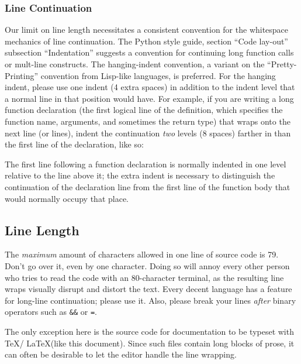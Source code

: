 \documentclass[12pt]{article}
\newcommand{\code}[1]{\texttt{#1}}
\begin{document}
\subsubsection{Line Continuation}
Our limit on line length necessitates a consistent convention for the whitespace mechanics of line continuation. The Python style guide, section ``Code lay-out'' subsection ``Indentation'' suggests a convention for continuing long function calls or mult-line constructs. The hanging-indent convention, a variant on the ``Pretty-Printing'' convention from Lisp-like languages, is preferred. For the hanging indent, please use one indent (4 extra spaces) in addition to the indent level that a normal line in that position would have. For example, if you are writing a long function declaration (the first logical line of the definition, which specifies the function name, arguments, and sometimes the return type) that wraps onto the next line (or lines), indent the continuation \emph{two} levels (8 spaces) farther in than the first line of the declaration, like so:
\begin{codeex}
// Function declaration
VisionInterface:: VisionInterface(
        Matx33f cameraMat, Mat distCoeffs, Matx33f perspTrans,
        std::string camAddress) :
        cameraMat(cameraMat), distCoeffs(distCoeffs), perspTrans(perspTrans) {
    // Start of function body
    if (!source.open(camAddress)) {
\end{codeex}
The first line following a function declaration is normally indented in one level relative to the line above it; the extra indent is necessary to distinguish the continuation of the declaration line from the first line of the function body that would normally occupy that place.

\subsection{Line Length} The \emph{maximum} amount of characters allowed in one line of source code is 79. Don't go over it, even by one character. Doing so will annoy every other person who tries to read the code with an 80-character terminal, as the resulting line wraps visually disrupt and distort the text. Every decent language has a feature for long-line continuation; please use it. Also, please break your lines \textit{after} binary operators such as \code{\&\&} or \code{=}.

The only exception here is the source code for documentation to be typeset with \TeX / \LaTeX (like this document). Since such files contain long blocks of prose, it can often be desirable to let the editor handle the line wrapping.
\end{document}
